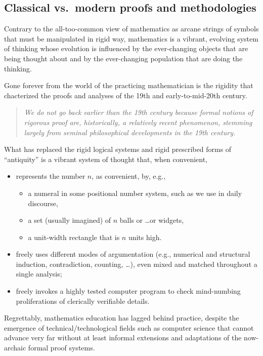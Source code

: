 \subsection{Classical vs.~modern proofs and methodologies}
\label{sec:classical-v-modern-proofs}

Contrary to the all-too-common view of mathematics as arcane strings
of symbols that must be manipulated in rigid way, mathematics is a
vibrant, evolving system of thinking whose evolution is influenced by
the ever-changing objects that are being thought about and by the
ever-changing population that are doing the thinking.

Gone forever from the world of the practicing mathematician is the
rigidity that chacterized the proofs and analyses of the 19th and
early-to-mid-20th century.
\begin{quote}
{\em We do not go back earlier than the 19th century because
formal notions of rigorous proof are, historically, a relatively
recent phenomenon, stemming largely from seminal philosophical
developments in the 19th century.}
\end{quote}
What has replaced the rigid logical systems and rigid prescribed forms
of ``antiquity'' is a vibrant system of thought that, when convenient,
\begin{itemize}
\item
represents the  number $n$, as convenient, by, e.g.,
  \begin{itemize}
  \item
a numeral in some positional number system, such as we use in daily
discourse,
  \item
a set (usually imagined) of $n$ balls or \ldots or widgets,
  \item
a unit-width rectangle that is $n$ units high.
  \end{itemize}

\item
freely uses different modes of argumentation (e.g., numerical and
structural induction, contradiction, counting, \ldots), even mixed and
matched throughout a single analysis;

\item
freely invokes a highly tested computer program to check mind-numbing
proliferations of clerically verifiable details.
\end{itemize}

Regrettably, mathematics education has lagged behind practice, despite
the emergence of technical/technological fields such as computer
science that cannot advance very far without at least informal
extensions and adaptations of the now-archaic formal proof systems.

